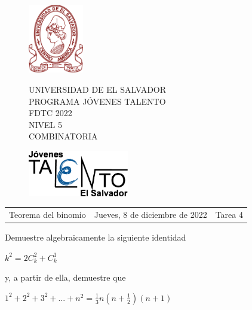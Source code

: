 \documentclass[12pt]{article}
\newcommand{\tema}{Teorema del binomio}
\newcommand{\fecha}{Jueves, 8 de diciembre de 2022}
\newcommand{\sesion}{Tarea 4}
\begin{document}
\thispagestyle{empty}

\begin{figure}[h] 
	\begin{minipage}[b]{0.26\textwidth}
		\begin{center}
			\includegraphics[height=3cm]{Logos/UES.png}
			\par\end{center}
	\end{minipage} 
	\begin{minipage}[b]{0.46\textwidth}
		\begin{center}
			UNIVERSIDAD DE EL SALVADOR\\ [0.1cm]
			PROGRAMA JÓVENES TALENTO\\ [0.1cm]
	        FDTC 2022\\ [0.1cm]
                NIVEL 5\\ [0.1cm]
			COMBINATORIA 
			\par\end{center}
	\end{minipage} 
	\begin{minipage}[b]{0.05\textwidth}
		\begin{center}
			\includegraphics[height=2cm]{Logos/LOGO PJT.png}
			\par\end{center}
	\end{minipage}
\end{figure}

\begin{center}
    \begin{tabular}{p{4.5cm} p{7cm} p{4.5cm}}
        \tema & \centering\fecha & \hfill\sesion
    \end{tabular}
\end{center}

\begin{problema}
    Demuestre algebraicamente la siguiente identidad

    \begin{center}
        $k^2 = 2 C^{2}_{k} + C^{1}_{k}$
    \end{center}

    y, a partir de ella, demuestre que 

    \begin{center}
        $1^2 + 2^2 + 3^2 + ... + n^2 = \frac{1}{3} n (n+\frac{1}{2})(n+1)$
    \end{center}
\end{problema}
\end{document}
